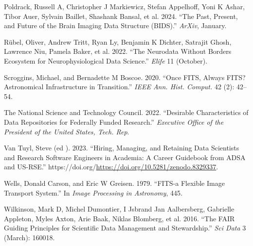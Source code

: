 \documentclass[
  letterpaper,
  DIV=11,
  numbers=noendperiod]{scrartcl}
\newlength{\cslhangindent}
\newenvironment{CSLReferences}[2] %
 {\begin{list}{}{%
  \setlength{\itemindent}{0pt}
  \setlength{\leftmargin}{0pt}
  \setlength{\parsep}{0pt}
  \ifodd #1
   \setlength{\leftmargin}{\cslhangindent}
   \setlength{\itemindent}{-1\cslhangindent}
  \fi
  \setlength{\itemsep}{#2\baselineskip}}}
 {\end{list}}
\begin{document}
\begin{CSLReferences}{1}{0}
Poldrack, Russell A, Christopher J Markiewicz, Stefan Appelhoff, Yoni K
Ashar, Tibor Auer, Sylvain Baillet, Shashank Bansal, et al. 2024. {``The
Past, Present, and Future of the Brain Imaging Data Structure
({BIDS}).''} \emph{ArXiv}, January.

Rübel, Oliver, Andrew Tritt, Ryan Ly, Benjamin K Dichter, Satrajit
Ghosh, Lawrence Niu, Pamela Baker, et al. 2022. {``The Neurodata Without
Borders Ecosystem for Neurophysiological Data Science.''} \emph{Elife}
11 (October).

Scroggins, Michael, and Bernadette M Boscoe. 2020. {``Once {FITS},
Always {FITS}? Astronomical Infrastructure in Transition.''} \emph{IEEE
Ann. Hist. Comput.} 42 (2): 42--54.

The National Science and Technology Council. 2022. {``Desirable
Characteristics of Data Repositories for Federally Funded Research.''}
\emph{Executive Office of the President of the United States, Tech.
Rep}.

Van Tuyl, Steve (ed ). 2023. {``Hiring, Managing, and Retaining Data
Scientists and Research Software Engineers in Academia: A Career
Guidebook from {ADSA} and {US}-{RSE}.''}
https://doi.org/\url{https://doi.org/10.5281/zenodo.8329337}.

Wells, Donald Carson, and Eric W Greisen. 1979. {``FITS-a Flexible Image
Transport System.''} In \emph{Image Processing in Astronomy}, 445.

Wilkinson, Mark D, Michel Dumontier, I Jsbrand Jan Aalbersberg,
Gabrielle Appleton, Myles Axton, Arie Baak, Niklas Blomberg, et al.
2016. {``The {FAIR} Guiding Principles for Scientific Data Management
and Stewardship.''} \emph{Sci Data} 3 (March): 160018.

\end{CSLReferences}
\end{document}
